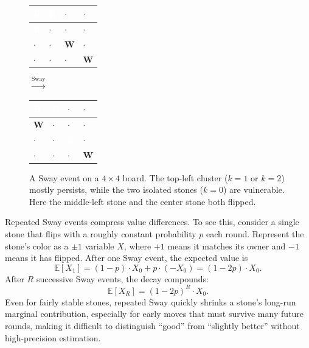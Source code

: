 \begin{figure}[ht]
\centering
\begin{tabular}{|w{c}{1.2em}|w{c}{1.2em}|w{c}{1.2em}|w{c}{1.2em}|}
\hline
{}\textcolor{white}{\textbf{B}} & \textcolor{white}{\textbf{B}} & $\cdot$ & $\cdot$ \\
\hline
{}\textcolor{white}{\textbf{B}} & $\cdot$ & $\cdot$ & $\cdot$ \\
\hline
$\cdot$ & $\cdot$ & \textbf{W} & $\cdot$ \\
\hline
$\cdot$ & $\cdot$ & $\cdot$ & \textbf{W} \\
\hline
\end{tabular}
\hspace{1.5cm}
$\xrightarrow{\text{Sway}}$
\hspace{1.5cm}
\begin{tabular}{|w{c}{1.2em}|w{c}{1.2em}|w{c}{1.2em}|w{c}{1.2em}|}
\hline
{}\textcolor{white}{\textbf{B}} & \textcolor{white}{\textbf{B}} & $\cdot$ & $\cdot$ \\
\hline
{}\textbf{W} & $\cdot$ & $\cdot$ & $\cdot$ \\
\hline
$\cdot$ & $\cdot$ & \textcolor{white}{\textbf{B}} & $\cdot$ \\
\hline
$\cdot$ & $\cdot$ & $\cdot$ & \textbf{W} \\
\hline
\end{tabular}
\caption{A Sway event on a $4 \times 4$ board. The top-left cluster ($k=1$ or $k=2$) mostly persists, while the two isolated stones ($k=0$) are vulnerable. Here the middle-left stone and the center stone both flipped.}
\label{fig:sway-event}
\end{figure}

Repeated Sway events compress value differences.
To see this, consider a single stone that flips with a roughly constant probability $p$ each round.
Represent the stone's color as a $\pm 1$ variable $X$, where $+1$ means it matches its owner and $-1$ means it has flipped.
After one Sway event, the expected value is
\begin{equation}
\mathbb{E}[X_1] = (1 - p) \cdot X_0 + p \cdot (-X_0) = (1 - 2p) \cdot X_0.
\end{equation}
After $R$ successive Sway events, the decay compounds:
\begin{equation}
\mathbb{E}[X_R] = (1 - 2p)^R \cdot X_0.
\end{equation}
Even for fairly stable stones, repeated Sway quickly shrinks a stone's long-run marginal contribution, especially for early moves that must survive many future rounds, making it difficult to distinguish ``good'' from ``slightly better'' without high-precision estimation.

